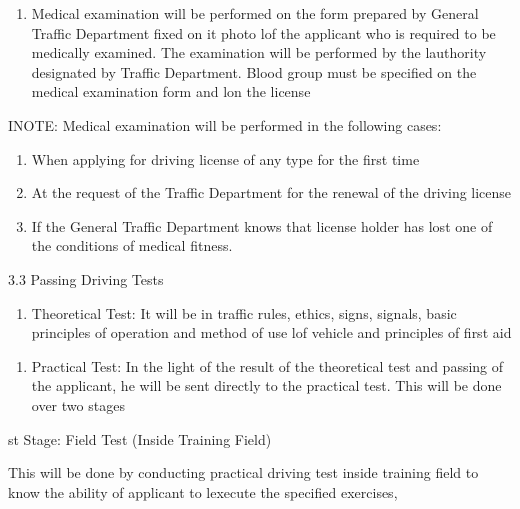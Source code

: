 \documentclass{book}
\begin{document}
\begin{enumerate}
	\def\labelenumi{\arabic{enumi}.}
	\setcounter{enumi}{1}
	\tightlist
	\item
	      Medical examination will be performed on the form prepared by General
	      Traffic Department fixed on it photo lof the applicant who is required
	      to be medically examined. The examination will be performed by the
	      lauthority designated by Traffic Department. Blood group\textbar{}
	      must be specified on the medical examination form and lon the license
\end{enumerate}

INOTE: Medical examination will be performed in the following cases:

\begin{enumerate}
	\def\labelenumi{\arabic{enumi}.}
	\item
	      When applying for driving license of any type for the first time
	\item
	      At the request of the Traffic Department for the renewal of the
	      driving license
	\item
	      If the General Traffic Department knows that license holder has lost
	      one of the conditions of medical fitness.
\end{enumerate}

3.3 Passing Driving Tests

\begin{enumerate}
	\def\labelenumi{\roman{enumi}.}
	\tightlist
	\item
	      Theoretical Test: It will be in traffic rules, ethics, signs, signals,
	      basic principles of operation and method of use lof vehicle and
	      principles of first aid
\end{enumerate}

\begin{enumerate}
	\def\labelenumi{\arabic{enumi}.}
	\setcounter{enumi}{1}
	\tightlist
	\item
	      Practical Test: In the light of the result of the theoretical test and
	      passing of the applicant, he will be sent directly to the practical
	      test. This will be done over two stages
\end{enumerate}

st Stage: Field Test (Inside Training Field)

This will be done by conducting practical driving test inside training
field to know the ability of applicant to lexecute the specified
exercises,
\end{document}
